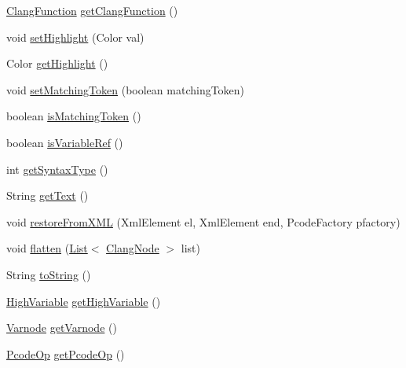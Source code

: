 \begin{DoxyCompactItemize}
\item 
\mbox{\hyperlink{classghidra_1_1app_1_1decompiler_1_1_clang_function}{Clang\+Function}} \mbox{\hyperlink{classghidra_1_1app_1_1decompiler_1_1_clang_token_a786354033254b3425a2200a3141e7cfd}{get\+Clang\+Function}} ()
\item 
void \mbox{\hyperlink{classghidra_1_1app_1_1decompiler_1_1_clang_token_abc4aa5a1ad389a7bc71377aee25048e0}{set\+Highlight}} (Color val)
\item 
Color \mbox{\hyperlink{classghidra_1_1app_1_1decompiler_1_1_clang_token_a9732960b1a55039d9230bf14081cc8bc}{get\+Highlight}} ()
\item 
void \mbox{\hyperlink{classghidra_1_1app_1_1decompiler_1_1_clang_token_a2d9efb4f3f0e30eee0bd27cfff526755}{set\+Matching\+Token}} (boolean matching\+Token)
\item 
boolean \mbox{\hyperlink{classghidra_1_1app_1_1decompiler_1_1_clang_token_af3a83e7be8996293de2312e2a802e42b}{is\+Matching\+Token}} ()
\item 
boolean \mbox{\hyperlink{classghidra_1_1app_1_1decompiler_1_1_clang_token_a57eb2eafbb303ab28ee52d815e7c1f4c}{is\+Variable\+Ref}} ()
\item 
int \mbox{\hyperlink{classghidra_1_1app_1_1decompiler_1_1_clang_token_abc4ee81e384e94cf8ef1bcb566b3498d}{get\+Syntax\+Type}} ()
\item 
String \mbox{\hyperlink{classghidra_1_1app_1_1decompiler_1_1_clang_token_a416468e5684d3f35aad5c82ce9ee3943}{get\+Text}} ()
\item 
void \mbox{\hyperlink{classghidra_1_1app_1_1decompiler_1_1_clang_token_a3236274b52425653a2986ada2874fa99}{restore\+From\+X\+ML}} (Xml\+Element el, Xml\+Element end, Pcode\+Factory pfactory)
\item 
void \mbox{\hyperlink{classghidra_1_1app_1_1decompiler_1_1_clang_token_ac9713a2cef771ae4ac71d0989593b3ed}{flatten}} (\mbox{\hyperlink{xml_8hh_ab5ab62f46b3735557c125f91b40ac155}{List}}$<$ \mbox{\hyperlink{interfaceghidra_1_1app_1_1decompiler_1_1_clang_node}{Clang\+Node}} $>$ list)
\item 
String \mbox{\hyperlink{classghidra_1_1app_1_1decompiler_1_1_clang_token_aafc7dbd3697a06c13f347947e1a2e9b5}{to\+String}} ()
\item 
\mbox{\hyperlink{class_high_variable}{High\+Variable}} \mbox{\hyperlink{classghidra_1_1app_1_1decompiler_1_1_clang_token_ac435f687ea1b950f859e66445763e413}{get\+High\+Variable}} ()
\item 
\mbox{\hyperlink{class_varnode}{Varnode}} \mbox{\hyperlink{classghidra_1_1app_1_1decompiler_1_1_clang_token_a21f48d0c10bcae5c9d19d1f99fc6a407}{get\+Varnode}} ()
\item 
\mbox{\hyperlink{class_pcode_op}{Pcode\+Op}} \mbox{\hyperlink{classghidra_1_1app_1_1decompiler_1_1_clang_token_a96d9143747ec664bf622560d80367455}{get\+Pcode\+Op}} ()
\end{DoxyCompactItemize}
